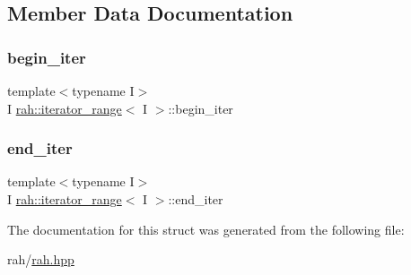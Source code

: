 \subsection{Member Data Documentation}
\mbox{\label{structrah_1_1iterator__range_a7c1da45d5ed07caead073472776cf298}} 
\subsubsection{\texorpdfstring{begin\_iter}{begin\_iter}}
{\footnotesize\ttfamily template$<$typename I$>$ \\
I \mbox{\hyperlink{structrah_1_1iterator__range}{rah\+::iterator\+\_\+range}}$<$ I $>$\+::begin\+\_\+iter}

\mbox{\label{structrah_1_1iterator__range_aa9bfeef57b703dbdd5444afb426db863}} 
\subsubsection{\texorpdfstring{end\_iter}{end\_iter}}
{\footnotesize\ttfamily template$<$typename I$>$ \\
I \mbox{\hyperlink{structrah_1_1iterator__range}{rah\+::iterator\+\_\+range}}$<$ I $>$\+::end\+\_\+iter}



The documentation for this struct was generated from the following file\+:\begin{DoxyCompactItemize}
\item 
rah/\mbox{\hyperlink{rah_8hpp}{rah.\+hpp}}\end{DoxyCompactItemize}
